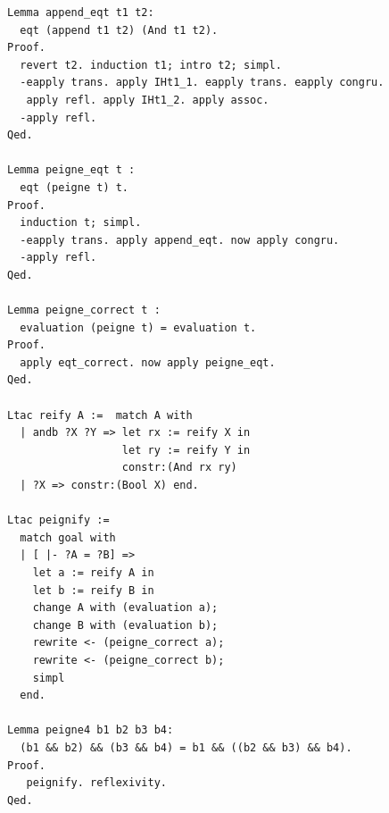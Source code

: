 \documentclass[11pt]{article}
\begin{document}
\begin{lstlisting}[frame=single]
Lemma append_eqt t1 t2:
  eqt (append t1 t2) (And t1 t2).
Proof.
  revert t2. induction t1; intro t2; simpl.
  -eapply trans. apply IHt1_1. eapply trans. eapply congru.
   apply refl. apply IHt1_2. apply assoc.
  -apply refl.
Qed.

Lemma peigne_eqt t :
  eqt (peigne t) t.
Proof.
  induction t; simpl.
  -eapply trans. apply append_eqt. now apply congru.
  -apply refl.
Qed.

Lemma peigne_correct t :
  evaluation (peigne t) = evaluation t.
Proof.
  apply eqt_correct. now apply peigne_eqt.
Qed. 

Ltac reify A :=  match A with
  | andb ?X ?Y => let rx := reify X in
                  let ry := reify Y in
                  constr:(And rx ry)
  | ?X => constr:(Bool X) end.

Ltac peignify :=
  match goal with
  | [ |- ?A = ?B] =>
    let a := reify A in
    let b := reify B in
    change A with (evaluation a);
    change B with (evaluation b);
    rewrite <- (peigne_correct a);
    rewrite <- (peigne_correct b);
    simpl
  end.

Lemma peigne4 b1 b2 b3 b4:
  (b1 && b2) && (b3 && b4) = b1 && ((b2 && b3) && b4).
Proof.
   peignify. reflexivity.
Qed.
\end{lstlisting}
\end{document}
